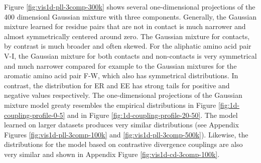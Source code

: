\documentclass[11pt,a4paper,twoside]{book}
\theoremstyle{definition}
\theoremstyle{definition}
\theoremstyle{remark}
\begin{document}
Figure \ref{fig:vis1d-pll-3comp-300k} shows several one-dimensional
projections of the 400 dimensionl Gaussian mixture with three
components. Generally, the Gaussian mixture learned for residue pairs
that are not in contact is much narrower and almost symmetrically
centered around zero. The Gaussian mixture for contacts, by contrast is
much broader and often skewed. For the aliphatic amino acid pair V-I,
the Gaussian mixture for both contacts and non-contacts is very
symmetrical and much narrower compared for example to the Gaussian
mixtures for the aromatic amino acid pair F-W, which also has
symmetrical distributions. In contrast, the distribution for ER and EE
has strong tails for positive and negative values respectively. The
one-dimensional projections of the Gaussian mixture model greaty
resembles the empirical distributions in Figure
\ref{fig:1d-coupling-profile-0-5} and in Figure
\ref{fig:1d-coupling-profile-20-50}. The model learned on larger
datasets produces very similar distributions (see Appendix Figures
\ref{fig:vis1d-pll-3comp-100k} and \ref{fig:vis1d-pll-3comp-500k}).
Likewise, the distributions for the model based on contrastive
divergence couplings are also very similar and shown in Appendix Figure
\ref{fig:vis1d-cd-3comp-100k}.
\end{document}
